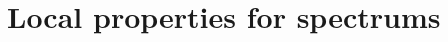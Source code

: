 \documentclass[12pt]{amsart}
\newtheorem{theorem}{Theorem}[section]
\theoremstyle{definition}
\newtheorem*{axiom}{Axiom}
\newcommand{\mbb}[1]{\mathbb{#1}}
\newcommand{\I}{\mbb I}
\newcommand{\ms}[1]{\mathsf{#1}}
\newcommand{\eq}{\leftrightarrow}
\begin{document}






\section{Local properties for spectrums}\label{sec:local}
\end{document}
